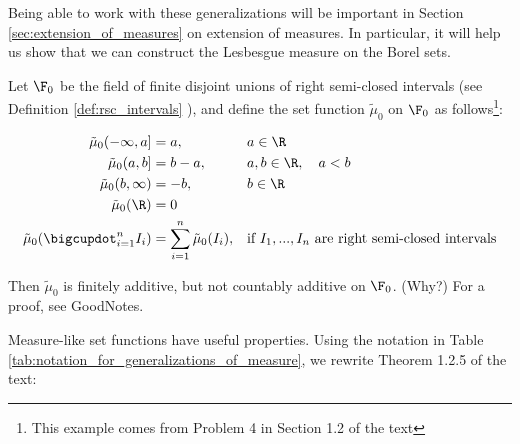 \documentclass{article} %
\newcommand{\fasf}{\tilde{\mu}_0}
\begin{document}
\begin{remark}
Being able to work with these generalizations will be important in Section \ref{sec:extension_of_measures} on extension of measures.  In particular, it will help us show that we can construct the Lesbesgue measure on the Borel sets.
\end{remark}

 \begin{example} Let $\F_0$ be the field of finite disjoint unions of right semi-closed intervals (see Definition \ref{def:rsc_intervals} ), and define the set function $\fasf$ on $\F_0$ as follows\footnote{This example comes from Problem 4 in Section 1.2 of the text}:

\begin{align*}
\fasf(-\infty,a] &=a, && a \in \R  \\
\fasf(a,b] &= b-a, && a,b \in \R, \quad a<b  \\
\fasf(b, \infty) &= -b, && b \in \R \\
\fasf(\R) &=0 &&\\
\fasf(\bigcupdot_{i=1}^n I_i) &= \sum_{i=1}^n \fasf(I_i), && \text{if $I_1, ..., I_n$ are right semi-closed intervals} 
\end{align*}
	
Then $\fasf$ is finitely additive, but not countably additive on $\F_0$.  (Why?) For a proof, see GoodNotes.
 \end{example}

 
Measure-like set functions have useful properties. Using the notation in Table \ref{tab:notation_for_generalizations_of_measure}, we rewrite Theorem 1.2.5 of the text:
 
\end{document}
